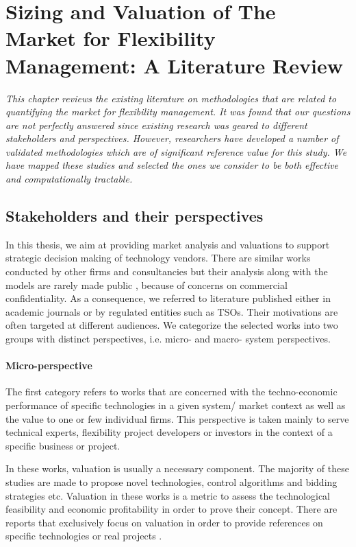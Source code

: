 \chapter{Sizing and Valuation of The Market for Flexibility Management: A Literature Review}
\label{ch:LitRev}
\textit{This chapter reviews the existing literature on methodologies that are related to quantifying the market for flexibility management. It was found that our questions are not perfectly answered since existing research was geared to different stakeholders and perspectives. However, researchers have developed a number of validated methodologies which are of significant reference value for this study. We have mapped these studies and selected the ones we consider to be both effective and computationally tractable.}

\section{Stakeholders and their perspectives}

In this thesis, we aim at providing market analysis and valuations to support strategic decision making of technology vendors. There are similar works conducted by other firms and consultancies but their analysis along with the models are rarely made public \cite{Zucker2013}, because of concerns on commercial confidentiality. As a consequence, we referred to literature published either in academic journals or by regulated entities such as TSOs. Their motivations are often targeted at different audiences. We categorize the selected works into two groups with distinct perspectives, i.e. micro- and macro- system perspectives.

\subsubsection{Micro-perspective}

The first category refers to works that are concerned with the techno-economic performance of specific technologies in a given system/ market context as well as the value to one or few individual firms. This perspective is taken mainly to serve technical experts, flexibility project developers or investors in the context of a specific business or project.

In these works, valuation is usually a necessary component. The majority of these studies are made to propose novel technologies, control algorithms and bidding strategies etc. Valuation in these works is a metric to assess the technological feasibility and economic profitability in order to prove their concept. There are reports that exclusively focus on valuation in order to provide references on specific technologies or real projects \cite{Mokrian2006,Walawalkar2007,Sioshansi2009,Byrne2012,Berrada2016,Salles2017}.

